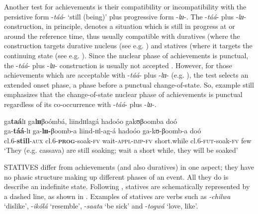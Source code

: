 \documentclass[output=paper,newtxmath,modfonts,nonflat,draftmode]{langsci/langscibook}
\begin{document}
Another test for achievements is their compatibility or incompatibility with the persistive form -\textit{táá}- ‘still (being)’ plus progressive form -\textit{lɪɪ}-. The -\textit{táá}- plus -\textit{lɪɪ}- construction, in principle, denotes a situation which is still in progress at or around the reference time, thus usually compatible with duratives (where the construction targets durative nucleus (see e.g. ) and statives (where it targets the continuing state (see e.g. ). Since the nuclear phase of achievements is punctual, the -\textit{táá}- plus -\textit{lɪɪ}- construction is usually not accepted . However, for those achievements which are acceptable with -\textit{táá}- plus -\textit{lɪɪ}- (e.g. ), the test selects an extended onset phase, a phase before a punctual change-of-state. So, example  still emphasizes that the change-of-state nuclear phase of achievements is punctual regardless of its co-occurrence with -\textit{táá}- plus -\textit{lɪɪ}-. 

\label{ex:kanijo:10}
\z

\ea \label{ex:kanijo:11}
\glll ga\textbf{taá}lɪ ga\textbf{l}\textbf{ɪɪ}βoómbá,  liindɪɪlagá hadoóo  gakʊβoomba doó\\
ga-\textbf{táá}-lɪ ga-\textbf{lɪɪ-}βoomb-a liind-ɪɪl-ag-á hadoóo       ga-kʊ-βoomb-a    doó\\ 
cl.6-\textbf{still}-\textsc{aux} cl.6-\textbf{\textsc{prog}}-soak-\textsc{fv} wait-\textsc{appl}-\textsc{imp}-\textsc{fv} short.while cl.6-\textsc{fut}-soak-\textsc{fv} few\\
\glt ‘They (e.g. cassava) are still soaking; wait a short while, they will be soaked’
\z

STATIVES differ from achievements (and also duratives) in one aspect; they have no phasic structure making up different phases of an event. All they do is describe an indefinite state. Following \citet{Kershner2002}, statives are schematically represented by a dashed line, as shown in . Examples of statives are verbs such as \textit{-chilwa} ‘dislike’, -\textit{ikólá} ‘resemble’, -\textit{saata} ‘be sick’ and -\textit{togwá} ‘love, like’. 
\end{document}
